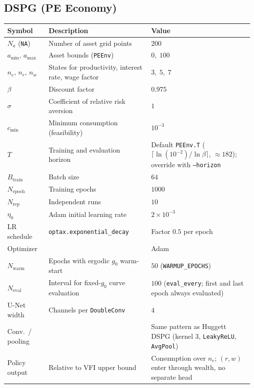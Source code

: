 \subsection{DSPG (PE Economy)}
\label{appendix_hyper_dspg_pe}
\begin{table}[H]
  \centering
  \small
  \setlength{\tabcolsep}{6pt}
  \renewcommand{\arraystretch}{1.15}
  \begin{tabular}{@{}p{2.4cm}p{6.2cm}p{4.8cm}@{}}
    \toprule
    Symbol & Description & Value \\
    \midrule
    $N_a$ (\texttt{NA}) & Number of asset grid points & $200$ \\
    $a_{\min},\,a_{\max}$ & Asset bounds (\texttt{PEEnv}) & $0,\;100$ \\
    $n_e,\,n_r,\,n_w$ & States for productivity, interest rate, wage factor & $3,\;5,\;7$ \\
    $\beta$ & Discount factor & $0.975$ \\
    $\sigma$ & Coefficient of relative risk aversion & $1$ \\
    $c_{\min}$ & Minimum consumption (feasibility) & $10^{-3}$ \\
    $T$ & Training and evaluation horizon & Default \texttt{PEEnv.T} ($\lceil \ln(10^{-2})/\ln\beta\rceil$, $\approx 182$); override with \texttt{--horizon} \\
    $B_{\mathrm{train}}$ & Batch size & $64$ \\
    $N_{\mathrm{epoch}}$ & Training epochs & $1000$ \\
    $N_{\mathrm{rep}}$ & Independent runs & $10$ \\
    $\eta_0$ & Adam initial learning rate & $2\times 10^{-3}$ \\
    LR schedule & \texttt{optax.exponential\_decay} & Factor $0.5$ per epoch \\
    Optimizer & & Adam \\
    $N_{\mathrm{warm}}$ & Epochs with ergodic $g_0$ warm-start & $50$ (\texttt{WARMUP\_EPOCHS}) \\
    $N_{\mathrm{eval}}$ & Interval for fixed-$g_0$ curve evaluation & $100$ (\texttt{eval\_every}; first and last epoch always evaluated) \\
    U-Net width & Channels per \texttt{DoubleConv} & $4$ \\
    Conv.\ / pooling & & Same pattern as Huggett DSPG (kernel $3$, \texttt{LeakyReLU}, \texttt{AvgPool}) \\
    Policy output & Relative to VFI upper bound & Consumption over $n_e$; $(r,w)$ enter through wealth, no separate head \\
    \bottomrule
  \end{tabular}
\end{table}

